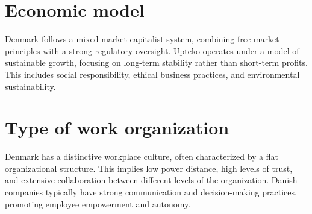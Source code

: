 \section{Economic model}
Denmark follows a mixed-market capitalist system, combining free market principles with a strong regulatory oversight. Upteko operates under a model of sustainable growth, focusing on long-term stability rather than short-term profits. This includes social responsibility, ethical business practices, and environmental sustainability.

\section{Type of work organization}
Denmark has a distinctive workplace culture, often characterized by a flat organizational structure. This implies low power distance, high levels of trust, and extensive collaboration between different levels of the organization. Danish companies typically have strong communication and decision-making practices, promoting employee empowerment and autonomy.